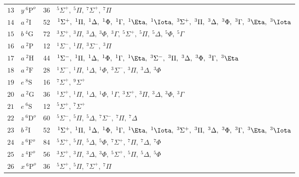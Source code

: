 \begin{table*}[]
\begin{tabular*}{\textwidth}{llll@{\extracolsep{\fill}}}
$ 13$ & $ y~^6\mathrm{P}^o$ &   36& $   ^{5}\Sigma^+,\ ^{5}\Pi,\   ^{7}\Sigma^+,\ ^{7}\Pi$ \\
$ 14$ & $ a~^2\mathrm{I}$   &   52& $   ^{1}\Sigma^+,\ ^{1}\Pi,\     ^{1}\Delta,\ ^{1}\Phi,\     ^{1}\Gamma,\ ^{1}\Eta,\      ^{1}\Iota,\   ^{3}\Sigma^+,\ ^{3}\Pi,\     ^{3}\Delta,\ ^{3}\Phi,\     ^{3}\Gamma,\ ^{3}\Eta,\      ^{3}\Iota$ \\
$ 15$ & $ b~^4\mathrm{G}$   &   72& $   ^{3}\Sigma^+,\ ^{3}\Pi,\     ^{3}\Delta,\ ^{3}\Phi,\     ^{3}\Gamma,\   ^{5}\Sigma^+,\ ^{5}\Pi,\     ^{5}\Delta,\ ^{5}\Phi,\     ^{5}\Gamma$ \\
$ 16$ & $ a~^2\mathrm{P}$   &   12& $   ^{1}\Sigma^-,\ ^{1}\Pi,\   ^{3}\Sigma^-,\ ^{3}\Pi$ \\
$ 17$ & $ a~^2\mathrm{H}$   &   44& $   ^{1}\Sigma^-,\ ^{1}\Pi,\     ^{1}\Delta,\ ^{1}\Phi,\     ^{1}\Gamma,\ ^{1}\Eta,\   ^{3}\Sigma^-,\ ^{3}\Pi,\     ^{3}\Delta,\ ^{3}\Phi,\     ^{3}\Gamma,\ ^{3}\Eta$ \\
$ 18$ & $ a~^2\mathrm{F}$   &   28& $   ^{1}\Sigma^-,\ ^{1}\Pi,\     ^{1}\Delta,\ ^{1}\Phi,\   ^{3}\Sigma^-,\ ^{3}\Pi,\     ^{3}\Delta,\ ^{3}\Phi$ \\
$ 19$ & $ e~^8\mathrm{S}$   &   16& $   ^{7}\Sigma^+,\   ^{9}\Sigma^+$ \\
$ 20$ & $ a~^2\mathrm{G}$   &   36& $   ^{1}\Sigma^+,\ ^{1}\Pi,\     ^{1}\Delta,\ ^{1}\Phi,\     ^{1}\Gamma,\   ^{3}\Sigma^+,\ ^{3}\Pi,\     ^{3}\Delta,\ ^{3}\Phi,\     ^{3}\Gamma$ \\
$ 21$ & $ e~^6\mathrm{S}$   &   12& $   ^{5}\Sigma^+,\   ^{7}\Sigma^+$ \\
$ 22$ & $ z~^6\mathrm{D}^o$ &   60& $   ^{5}\Sigma^-,\ ^{5}\Pi,\     ^{5}\Delta,\   ^{7}\Sigma^-,\ ^{7}\Pi,\     ^{7}\Delta$ \\
$ 23$ & $ b~^2\mathrm{I}$   &   52& $   ^{1}\Sigma^+,\ ^{1}\Pi,\     ^{1}\Delta,\ ^{1}\Phi,\     ^{1}\Gamma,\ ^{1}\Eta,\      ^{1}\Iota,\   ^{3}\Sigma^+,\ ^{3}\Pi,\     ^{3}\Delta,\ ^{3}\Phi,\     ^{3}\Gamma,\ ^{3}\Eta,\      ^{3}\Iota$ \\
$ 24$ & $ z~^6\mathrm{F}^o$ &   84& $   ^{5}\Sigma^+,\ ^{5}\Pi,\     ^{5}\Delta,\ ^{5}\Phi,\   ^{7}\Sigma^+,\ ^{7}\Pi,\     ^{7}\Delta,\ ^{7}\Phi$ \\
$ 25$ & $ z~^4\mathrm{F}^o$ &   56& $   ^{3}\Sigma^+,\ ^{3}\Pi,\     ^{3}\Delta,\ ^{3}\Phi,\   ^{5}\Sigma^+,\ ^{5}\Pi,\     ^{5}\Delta,\ ^{5}\Phi$ \\
$ 26$ & $ x~^6\mathrm{P}^o$ &   36& $   ^{5}\Sigma^+,\ ^{5}\Pi,\   ^{7}\Sigma^+,\ ^{7}\Pi$ \\

\end{tabular*}
\end{table*}
